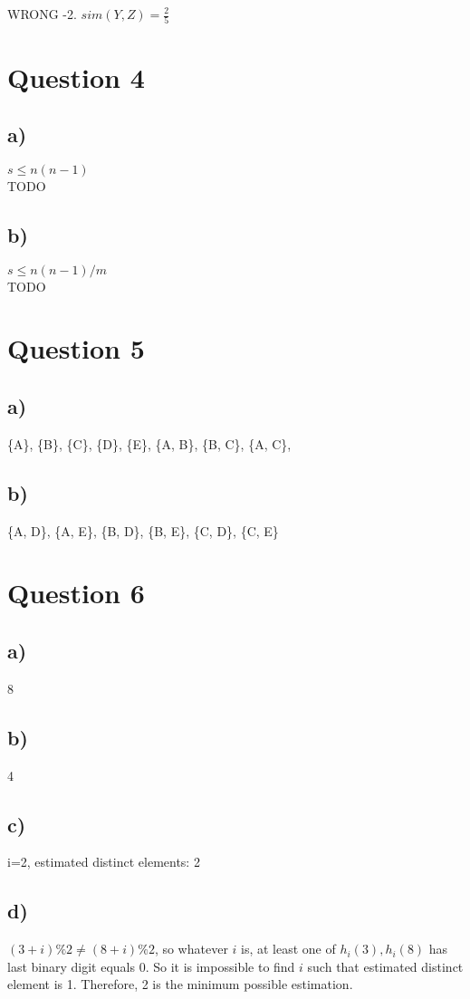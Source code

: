 \documentclass{article}
\begin{document}
WRONG -2. $sim(Y,Z) = \frac{2}{5}$ \\

\section{Question 4}
\subsection{a)}
$s \le n(n-1)$ \\ TODO

\subsection{b)}
$s \le n(n-1)/m$ \\ TODO

\section{Question 5}
\subsection{a)}
\{A\}, \{B\}, \{C\}, \{D\}, \{E\},  \{A, B\}, \{B, C\},  \{A, C\}, 

\subsection{b)}
\{A, D\}, \{A, E\}, \{B, D\}, \{B, E\}, \{C, D\},  \{C, E\}

\section{Question 6}
\subsection{a)}
8

\subsection{b)}
4

\subsection{c)}
i=2, estimated distinct elements: 2

\subsection{d)}
$(3 + i) \% 2 \ne (8 + i) \% 2$, so whatever $i$ is, at least one of $h_i(3), h_i(8)$ has last binary digit equals 0. So it is impossible to find $i$ such that estimated distinct element is 1. Therefore, 2 is the minimum possible estimation. 
\end{document}
